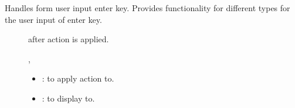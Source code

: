 \documentclass[letterpaper,10pt,english]{sphinxmanual}
\begin{document}
\begin{fulllineitems}

\begin{fulllineitems}
\label{\detokenize{index:_CPPv2N7ostendo5EnterE3Var6Window}}%
\pysigstartmultiline
{}\label{\detokenize{index:Pessumnamespaceostendo_1a9279674ead9b9c27ebc228430c1abfbe}}%
\pysigstopmultiline
Handles form user input enter key. Provides functionality for different {\hyperref[\detokenize{index:Pessumstructostendo_1_1Var}]{}} types for the user input of enter key. \begin{description}
\item[{}] \leavevmode
{\hyperref[\detokenize{index:Pessumstructostendo_1_1Var}]{}} after action is applied. 

\item[{}] \leavevmode
{\hyperref[\detokenize{index:Pessumstructostendo_1_1Var}]{}}, {\hyperref[\detokenize{index:Pessumclassostendo_1_1Window}]{}} 

\item[{}] \leavevmode\begin{itemize}
\item {} 
: {\hyperref[\detokenize{index:Pessumstructostendo_1_1Var}]{}} to apply action to. 

\item {} 
: {\hyperref[\detokenize{index:Pessumclassostendo_1_1Window}]{}} to display to. 

\end{itemize}

\end{description}


\end{fulllineitems}



\end{fulllineitems}
\end{document}
